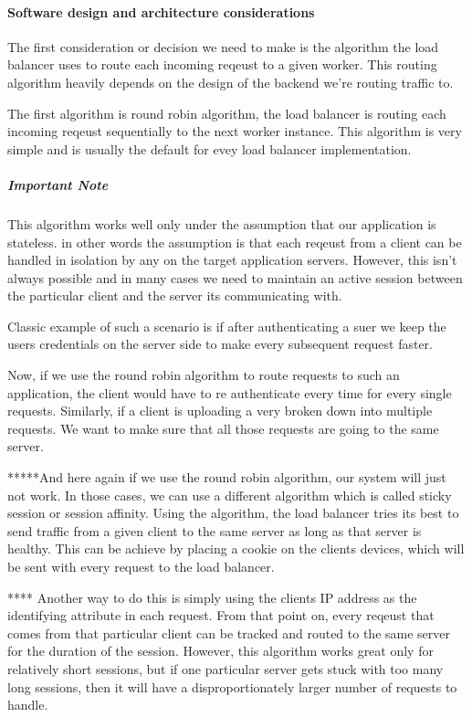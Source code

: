 \documentclass[a4paper, 11pt]{book}
\begin{document}
    \paragraph{Software design and architecture considerations}
    The first consideration or decision we need to make is the algorithm the load balancer uses to route each incoming reqeust to a given worker.
    This routing algorithm heavily depends on the design of the backend we're routing traffic to.

    The first algorithm is round robin algorithm, the load balancer is routing each incoming reqeust sequentially to the next worker instance.
    This algorithm is very simple and is usually the default for evey load balancer implementation.

    \subparagraph{Important Note} This algorithm works well only under the assumption that our application is stateless.
    in other words the assumption is that each reqeust from a client can be handled in isolation by any on the target application servers.
    However, this isn't always possible and in many cases we need to maintain an active session between the particular client and the server its communicating with.

    Classic example of such a scenario is if after authenticating a suer we keep the users credentials on the server side to make every subsequent request faster.

    Now, if we use the round robin algorithm to route requests to such an application, the client would have to re authenticate every time for every single requests.
    Similarly, if a client is uploading a very broken down into multiple requests.
    We want to make sure that all those requests are going to the same server.

    *****And here again if we use the round robin algorithm, our system will just not work.
    In those cases, we can use a different algorithm which is called sticky session or session affinity.
    Using the algorithm, the load balancer tries its best to send traffic from a given client to the same server as long as that server is healthy.
    This can be achieve by placing a cookie on the clients devices, which will be sent with every request to the load balancer.

    **** Another way to do this is simply using the clients IP address as the identifying attribute in each request.
    From that point on, every reqeust that comes from that particular client can be tracked and routed to the same server for the duration of the session.
    However, this algorithm works great only for relatively short sessions, but if one particular server gets stuck with too many long sessions, then it will have a disproportionately larger number of requests to handle.
\end{document}
